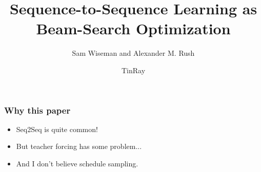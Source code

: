 \documentclass{beamer}
\title{Sequence-to-Sequence Learning as Beam-Search Optimization}
\author{Sam Wiseman and Alexander M. Rush}
\date{TinRay}
\begin{document}


\frame{\titlepage}

\begin{frame}
  \frametitle{Why this paper}
  \begin{itemize}
  \item Seq2Seq is quite common!
  \item But teacher forcing has some problem...
  \item And I don't believe schedule sampling.
  \end{itemize}
\end{frame}





% 
\end{document}
